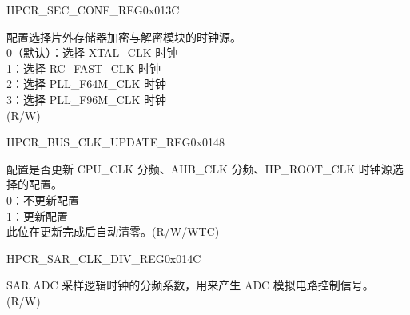 \begin{register}{H}{PCR\_SEC\_CONF\_REG}{0x013C}\label{regdesc:PCRSECCONFREG}
%
%
\regnewline%
\begin{regdesc}\begin{reglist}
\label{fielddesc:PCRSECCLKSEL}\item [PCR\_SEC\_CLK\_SEL] 配置选择片外存储器加密与解密模块的时钟源。\\
0（默认）：选择 XTAL\_CLK 时钟\\
1：选择 RC\_FAST\_CLK 时钟\\
2：选择 PLL\_F64M\_CLK 时钟\\
3：选择 PLL\_F96M\_CLK 时钟\\ (R/W)
\end{reglist}\end{regdesc}
\end{register}

\begin{register}{H}{PCR\_BUS\_CLK\_UPDATE\_REG}{0x0148}\label{regdesc:PCRBUSCLKUPDATEREG}
%
%
\regnewline%
\begin{regdesc}\begin{reglist}
\label{fielddesc:PCRBUSCLOCKUPDATE}\item [PCR\_BUS\_CLOCK\_UPDATE] 配置是否更新 CPU\_CLK 分频、AHB\_CLK 分频、HP\_ROOT\_CLK 时钟源选择的配置。\\
0：不更新配置\\
1：更新配置\\
此位在更新完成后自动清零。(R/W/WTC)
\end{reglist}\end{regdesc}
\end{register}


\begin{register}{H}{PCR\_SAR\_CLK\_DIV\_REG}{0x014C}\label{regdesc:PCRSARCLKDIVREG}
%
%
\regnewline%
\begin{regdesc}\begin{reglist}
\label{fielddesc:PCRSAR1CLKDIVNUM}\item [PCR\_SAR1\_CLK\_DIV\_NUM] SAR ADC 采样逻辑时钟的分频系数，用来产生 ADC 模拟电路控制信号。 (R/W)
\end{reglist}\end{regdesc}
\end{register}






